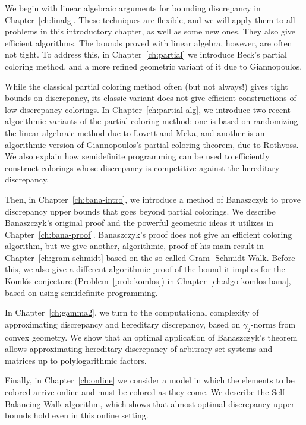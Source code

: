 We begin with linear algebraic arguments for bounding discrepancy in
Chapter~\ref{ch:linalg}. These techniques are flexible, and we will
apply them to all problems in this introductory chapter, as well as
some new ones. They also give efficient algorithms. The bounds proved
with linear algebra, however, are often not tight. To address this, in
Chapter~\ref{ch:partial} we introduce Beck's partial coloring method,
and a more refined geometric variant of it due to Giannopoulos. 

While the classical
partial coloring method often (but not always!)  gives tight bounds on
discrepancy, its classic variant does not give efficient constructions
of low discrepancy colorings. In Chapter~\ref{ch:partial-alg}, we introduce two recent
algorithmic variants of the partial coloring method: one is based on
randomizing the linear algebraic method due to Lovett and Meka, and another is an algorithmic
version of Giannopoulos's partial coloring theorem, due to Rothvoss. We also explain how semidefinite programming can be used to efficiently construct colorings whose discrepancy is competitive against the hereditary discrepancy. 

Then, in
Chapter~\ref{ch:bana-intro}, we introduce a method of Banaszczyk to prove discrepancy upper bounds that goes beyond partial colorings. We
describe Banaszczyk's original proof and the powerful geometric ideas
it utilizes in Chapter~\ref{ch:bana-proof}. Banaszczyk's proof does not
give an efficient coloring algorithm, but we give another,
algorithmic, proof of his main result in
Chapter~\ref{ch:gram-schmidt} based on the so-called Gram-
Schmidt Walk. Before this, we also give a different algorithmic proof of the bound it implies for the Koml\'os conjecture (Problem~\ref{prob:komlos}) in Chapter~\ref{ch:algo-komlos-bana}, based on using semidefinite programming. 

In Chapter~\ref{ch:gamma2}, we turn to
the computational complexity of approximating discrepancy and
hereditary discrepancy, based on $\gamma_2$-norms from convex geometry. We show that an optimal application of
Banaszczyk's theorem allows approximating hereditary discrepancy of
arbitrary set systems and matrices up to polylogarithmic
factors. 

Finally, in Chapter~\ref{ch:online} we consider a model in
which the elements to be colored arrive online and must be colored as
they come. We describe the Self-Balancing Walk algorithm, which shows that almost optimal discrepancy upper bounds hold even in
this online setting.

